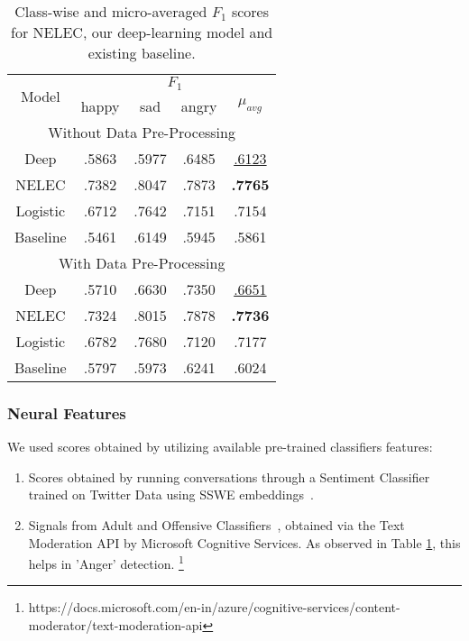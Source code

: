 \documentclass[11pt,a4paper]{article}
\begin{document}
\begin{table}[h]
\centering
 \begin{tabular}{||c |c |c |c |c||} 
 \hline
 \multirow{2}{*}{Model} & \multicolumn{4}{|c||}{$F_{1}$} \\
 \cline{2-5}
  & happy & sad & angry & $\mu_{avg}$\\
 \hline  
 \hline\hline
 \multicolumn{5}{|c||}{Without Data Pre-Processing} \\
 \hline
 Deep & .5863 & .5977 & .6485 & \underline{.6123} \\ 
 \hline
 NELEC & .7382 & .8047 & .7873 & \textbf{.7765}\\
 Logistic & .6712 & .7642 & .7151 & .7154 \\
 \hline
 Baseline & .5461 & .6149 & .5945 & .5861\\
 \hline
 \multicolumn{5}{|c||}{With Data Pre-Processing} \\
 \hline
 Deep & .5710 & .6630 & .7350 & \underline{.6651} \\ 
 \hline
 NELEC &  .7324 & .8015  & .7878 & \textbf{.7736}  \\
 Logistic & .6782 & .7680 & .7120 & .7177 \\
 \hline
 Baseline & .5797 & .5973 & .6241 & .6024 \\
 \hline
 \end{tabular}
 \caption{Class-wise and micro-averaged $F_{1}$ scores for NELEC, our deep-learning model and existing baseline.}
 \label{table:f1_results}
\end{table}

\subsubsection{Neural Features} \label{neuralfeatures}
We used scores obtained by utilizing available pre-trained classifiers features:
\begin{enumerate}
    \item Scores obtained by running conversations through a Sentiment Classifier trained on Twitter Data using SSWE embeddings~\cite{tang2014learning}. 
    \item Signals from Adult and Offensive Classifiers~\cite{yenala2017deep}, obtained via the Text Moderation API by Microsoft Cognitive Services. As observed in Table \ref{table:f1_results}, this helps in 'Anger' detection. \footnote{https://docs.microsoft.com/en-in/azure/cognitive-services/content-moderator/text-moderation-api}
\end{enumerate}
\end{document}
